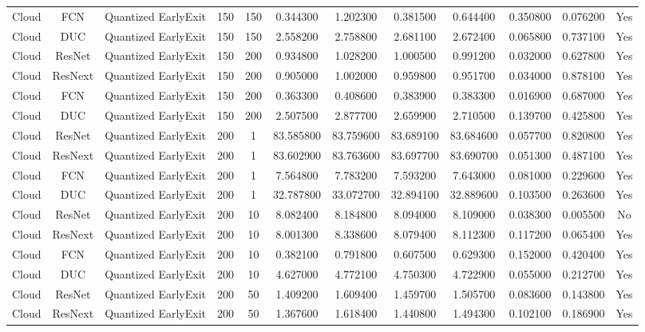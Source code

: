 \begin{tabular}{|c||c||c||c||c||c||c||c||c||c||c||c|}
Cloud & FCN & Quantized EarlyExit & 150 & 150 & 0.344300 & 1.202300 & 0.381500 & 0.644400 & 0.350800 & 0.076200 & Yes \\
Cloud & DUC & Quantized EarlyExit & 150 & 150 & 2.558200 & 2.758800 & 2.681100 & 2.672400 & 0.065800 & 0.737100 & Yes \\
Cloud & ResNet & Quantized EarlyExit & 150 & 200 & 0.934800 & 1.028200 & 1.000500 & 0.991200 & 0.032000 & 0.627800 & Yes \\
Cloud & ResNext & Quantized EarlyExit & 150 & 200 & 0.905000 & 1.002000 & 0.959800 & 0.951700 & 0.034000 & 0.878100 & Yes \\
Cloud & FCN & Quantized EarlyExit & 150 & 200 & 0.363300 & 0.408600 & 0.383900 & 0.383300 & 0.016900 & 0.687000 & Yes \\
Cloud & DUC & Quantized EarlyExit & 150 & 200 & 2.507500 & 2.877700 & 2.659900 & 2.710500 & 0.139700 & 0.425800 & Yes \\
Cloud & ResNet & Quantized EarlyExit & 200 & 1 & 83.585800 & 83.759600 & 83.689100 & 83.684600 & 0.057700 & 0.820800 & Yes \\
Cloud & ResNext & Quantized EarlyExit & 200 & 1 & 83.602900 & 83.763600 & 83.697700 & 83.690700 & 0.051300 & 0.487100 & Yes \\
Cloud & FCN & Quantized EarlyExit & 200 & 1 & 7.564800 & 7.783200 & 7.593200 & 7.643000 & 0.081000 & 0.229600 & Yes \\
Cloud & DUC & Quantized EarlyExit & 200 & 1 & 32.787800 & 33.072700 & 32.894100 & 32.889600 & 0.103500 & 0.263600 & Yes \\
Cloud & ResNet & Quantized EarlyExit & 200 & 10 & 8.082400 & 8.184800 & 8.094000 & 8.109000 & 0.038300 & 0.005500 & No \\
Cloud & ResNext & Quantized EarlyExit & 200 & 10 & 8.001300 & 8.338600 & 8.079400 & 8.112300 & 0.117200 & 0.065400 & Yes \\
Cloud & FCN & Quantized EarlyExit & 200 & 10 & 0.382100 & 0.791800 & 0.607500 & 0.629300 & 0.152000 & 0.420400 & Yes \\
Cloud & DUC & Quantized EarlyExit & 200 & 10 & 4.627000 & 4.772100 & 4.750300 & 4.722900 & 0.055000 & 0.212700 & Yes \\
Cloud & ResNet & Quantized EarlyExit & 200 & 50 & 1.409200 & 1.609400 & 1.459700 & 1.505700 & 0.083600 & 0.143800 & Yes \\
Cloud & ResNext & Quantized EarlyExit & 200 & 50 & 1.367600 & 1.618400 & 1.440800 & 1.494300 & 0.102100 & 0.186900 & Yes \\

\end{tabular}
